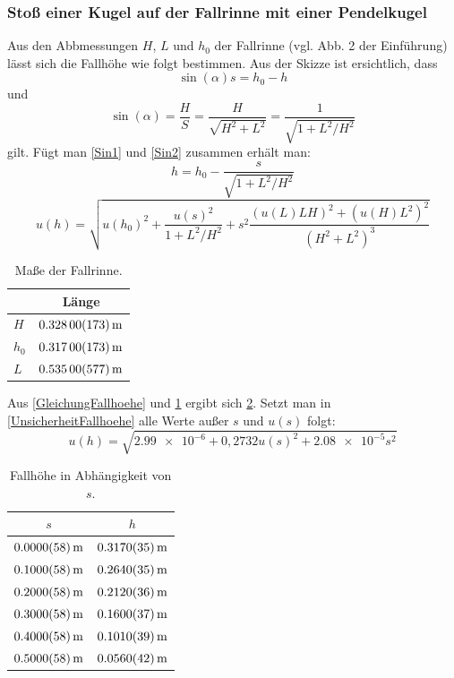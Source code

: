 \documentclass[
	a4paper,
	12pt,
	pagesize,
	ngerman
]{scrartcl}
\begin{document}
	\subsubsection{Stoß einer Kugel auf der Fallrinne mit einer Pendelkugel} %
	Aus den Abbmessungen $H$, $L$ und $h_0$ der Fallrinne (vgl. Abb. 2 der Einführung) lässt sich die Fallhöhe wie folgt bestimmen. Aus der Skizze ist ersichtlich, dass 
	\begin{equation}
		\sin(\alpha) s = h_0-h 
		\label{Sin1}
	\end{equation}
	und
	\begin{equation}
		\sin(\alpha) = \frac{H}{S} = \frac{H}{\sqrt{H^2+L^2}} = \frac{1}{\sqrt{1+L^2/H^2}}
		\label{Sin2}
	\end{equation}
	gilt. Fügt man \cref{Sin1} und \cref{Sin2} zusammen erhält man:
	\begin{equation}
		h = h_0 - \frac{s}{\sqrt{1+ L^2/H^2}}
		\label{GleichungFallhoehe}
	\end{equation}
	\begin{equation}
		u(h) = \sqrt{u(h_0)^2 + \frac{u(s)^2}{1+L^2/H^2} + s^2\frac{(u(L)LH)^2 + (u(H)L^2)^2}{(H^2 + L^2)^3} }
		\label{UnsicherheitFallhoehe}
	\end{equation}
	\begin{table}[tb]
	\centering
	\begin{tabular}{  l | c  }
		& Länge  \\ \hline 
		$H$ &  $\SI{0,328 \pm 0,00173}{m}$ \\ \hline %
		$h_0$ &  $\SI{0,317 \pm 0,00173}{m}$ \\ \hline %
		$L$ &  $\SI{0,535 \pm 0,00577}{m}$ \\ %
	\end{tabular}
	\caption{Maße der Fallrinne.}
	\label{MessungFallrinne}
	\end{table}
	Aus \cref{GleichungFallhoehe} und \cref{MessungFallrinne} ergibt sich \cref{TabelleFallhoehe}. Setzt man in \cref{UnsicherheitFallhoehe} alle Werte außer $s$ und $u(s)$ folgt:
	\begin{equation}
		u(h) = \sqrt{ \SI{2,99e-6}+ 0,2732u(s)^2 + \SI{2,08e-5}s^2 }
	\end{equation}
	\begin{table}[tb]
	\centering
	\begin{tabular}{  c | c  }
		$s$  & $h$ \\ \hline 
		$\SI{0,00 \pm 0,0058}{m}$ &  $\SI{0,317 \pm 0,0035}{m}$ \\ \hline
		$\SI{0,10 \pm 0,0058}{m}$ &  $\SI{0,264 \pm 0,0035}{m}$ \\ \hline 
		$\SI{0,20 \pm 0,0058}{m}$ &  $\SI{0,212 \pm 0,0036}{m}$ \\ \hline
		$\SI{0,30 \pm 0,0058}{m}$ &  $\SI{0,160 \pm 0,0037}{m}$ \\ \hline
		$\SI{0,40 \pm 0,0058}{m}$ &  $\SI{0,101 \pm 0,0039}{m}$ \\ \hline 
		$\SI{0,50 \pm 0,0058}{m}$ &  $\SI{0,056 \pm 0,0042}{m}$ \\ 
	\end{tabular}
	\caption{Fallhöhe in Abhängigkeit von $s$.}
		\label{TabelleFallhoehe}
	\end{table}
\end{document}
